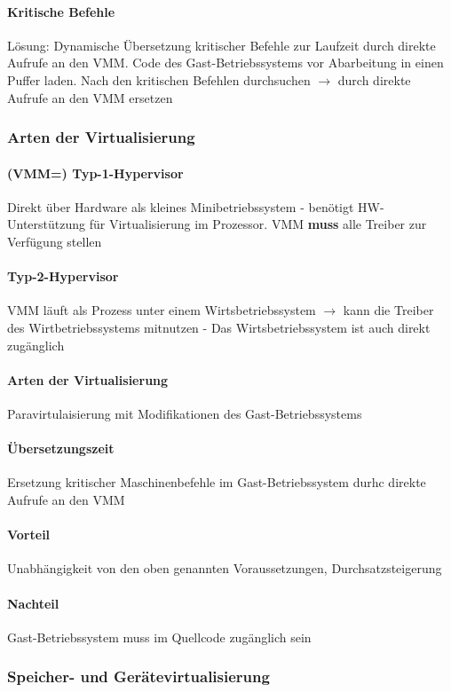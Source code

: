 \documentclass[11pt,a4paper,landscape]{article}
\begin{document}
\begin{multicols*}{3}
	\paragraph{Kritische Befehle} Lösung: Dynamische Übersetzung kritischer Befehle zur Laufzeit durch direkte Aufrufe an den VMM. Code des Gast-Betriebssystems vor Abarbeitung in einen Puffer laden. Nach den kritischen Befehlen durchsuchen $\rightarrow$ durch direkte Aufrufe an den VMM ersetzen
	\subsubsection{Arten der Virtualisierung}
	\paragraph{(VMM=) Typ-1-Hypervisor} Direkt über Hardware als kleines Minibetriebssystem - benötigt HW-Unterstützung für Virtualisierung im Prozessor. VMM \textbf{muss} alle Treiber zur Verfügung stellen
	\paragraph{Typ-2-Hypervisor} VMM läuft als Prozess unter einem Wirtsbetriebssystem $\rightarrow$ kann die Treiber des Wirtbetriebssystems mitnutzen - Das Wirtsbetriebssystem ist auch direkt zugänglich
	\paragraph{Arten der Virtualisierung} Paravirtulaisierung mit Modifikationen des Gast-Betriebssystems
	\paragraph{Übersetzungszeit} Ersetzung kritischer Maschinenbefehle im Gast-Betriebssystem durhc direkte Aufrufe an den VMM
	\paragraph{Vorteil} Unabhängigkeit von den oben genannten Voraussetzungen, Durchsatzsteigerung
	\paragraph{Nachteil} Gast-Betriebssystem muss im Quellcode zugänglich sein
	\subsubsection{Speicher- und Gerätevirtualisierung}

\end{multicols*}
\end{document}
